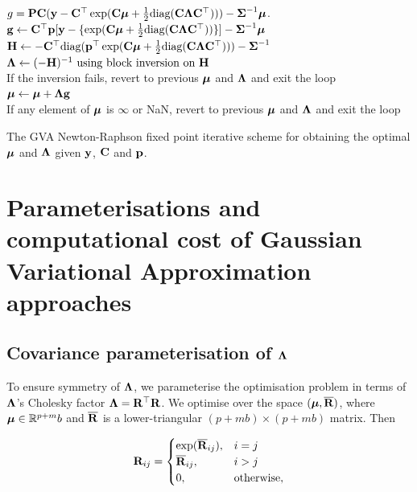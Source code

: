 	\begin{algorithm}
		\begin{algorithmic}
			\REQUIRE $g = {\bf P} {\bf C} ({\bf y} - {\bf C}^\top \exp({\bf C} {\boldsymbol \mu} + \frac{1}{2} \text{diag}{({\bf C}{\boldsymbol\Lambda}{\bf C}^\top)})) - {\boldsymbol \Sigma}^{-1} {\boldsymbol \mu}$.
				\STATE ${\bf g} \leftarrow {\bf C}^\top {\bf p} [{\bf y} - \{ \exp({\bf C} {\boldsymbol \mu} + \tfrac{1}{2} \text{diag}({\bf C} {\boldsymbol \Lambda} {\bf C}^\top)) \}] - {\boldsymbol \Sigma}^{-1} {\boldsymbol \mu}$ \\
				\STATE ${\bf H} \leftarrow -{\bf C}^\top \text{diag}({\bf p}^\top \exp({\bf C} {\boldsymbol \mu} + \tfrac{1}{2} \text{diag}({\bf C} {\boldsymbol \Lambda} {\bf C}^\top))) - {\boldsymbol \Sigma}^{-1}$ \\
				\STATE ${\boldsymbol \Lambda} \leftarrow (-{\bf H})^{-1} \text{ using block inversion on } {\bf H}$ \\
				If the inversion fails, revert to previous ${\boldsymbol \mu}$ and ${\boldsymbol \Lambda}$ and exit the loop \\
				\STATE ${\boldsymbol \mu} \leftarrow {\boldsymbol\mu} + {\boldsymbol \Lambda} {\bf g}$ \\
				If any element of ${\boldsymbol \mu}$ is $\infty$ or NaN, revert to previous ${\boldsymbol \mu}$ and ${\boldsymbol \Lambda}$ and exit the loop
			\ENDWHILE
		\end{algorithmic}
		\caption{The GVA Newton-Raphson fixed point iterative scheme for obtaining the optimal ${\boldsymbol \mu}$ and ${\boldsymbol \Lambda}$
			given ${\bf y}$, ${\bf C}$ and ${\bf p}$.}
		\label{alg:algorithm_nr}
	\end{algorithm}
			
			
	\section{Parameterisations and computational cost of Gaussian Variational Approximation approaches}
	\label{sec:param}
	\subsection{Covariance parameterisation of ${\boldsymbol \Lambda}$}
	
	To ensure symmetry of ${\boldsymbol \Lambda}$, we parameterise the optimisation problem in terms of ${\boldsymbol \Lambda}$'s
	Cholesky factor  ${\boldsymbol \Lambda} = {\bf R}^\top {\bf R}$. We optimise over the space $({\boldsymbol \mu}, \overline{{\bf R}})$, where ${\boldsymbol \mu}
	\in {\mathbb{R}}^{p + m}b$ and $\overline{{\bf R}}$ is a lower-triangular $(p + mb) \times (p + mb)$ matrix. Then
			
	\begin{equation*}
		{\bf R}_{ij} =
		\begin{cases}
			\exp(\overline{{\bf R}}_{ij}), & i = j             \\
			\overline{{\bf R}}_{ij},       & i > j             \\
			0,                         & \text{otherwise}, 
		\end{cases}
	\end{equation*}
			
